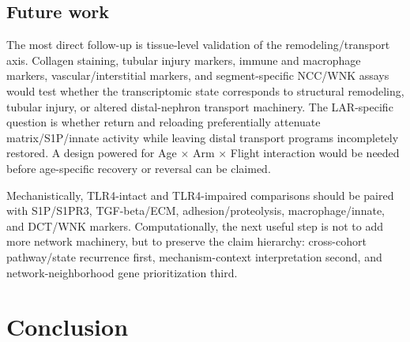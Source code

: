 \documentclass[11pt]{article}
\begin{document}
\subsection{Future work}

The most direct follow-up is tissue-level validation of the remodeling/transport axis. Collagen staining, tubular injury markers, immune and macrophage markers, vascular/interstitial markers, and segment-specific NCC/WNK assays would test whether the transcriptomic state corresponds to structural remodeling, tubular injury, or altered distal-nephron transport machinery. The LAR-specific question is whether return and reloading preferentially attenuate matrix/S1P/innate activity while leaving distal transport programs incompletely restored. A design powered for Age $\times$ Arm $\times$ Flight interaction would be needed before age-specific recovery or reversal can be claimed.

Mechanistically, TLR4-intact and TLR4-impaired comparisons should be paired with S1P/S1PR3, TGF-beta/ECM, adhesion/proteolysis, macrophage/innate, and DCT/WNK markers. Computationally, the next useful step is not to add more network machinery, but to preserve the claim hierarchy: cross-cohort pathway/state recurrence first, mechanism-context interpretation second, and network-neighborhood gene prioritization third.

\section{Conclusion}
\end{document}
